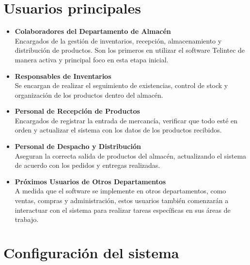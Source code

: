 \section{Usuarios principales}
\begin{itemize}
  \item \textbf{Colaboradores del Departamento de Almacén}\\
  Encargados de la gestión de inventarios, recepción, almacenamiento y distribución de productos. Son los primeros en utilizar el software Telintec de manera activa y principal foco en esta etapa inicial.

  \item \textbf{Responsables de Inventarios}\\
  Se encargan de realizar el seguimiento de existencias, control de stock y organización de los productos dentro del almacén.

  \item \textbf{Personal de Recepción de Productos}\\
  Encargados de registrar la entrada de mercancía, verificar que todo esté en orden y actualizar el sistema con los datos de los productos recibidos.

  \item \textbf{Personal de Despacho y Distribución}\\
  Aseguran la correcta salida de productos del almacén, actualizando el sistema de acuerdo con los pedidos y entregas realizadas.

  \item \textbf{Próximos Usuarios de Otros Departamentos}\\
  A medida que el software se implemente en otros departamentos, como ventas, compras y administración, estos usuarios también comenzarán a interactuar con el sistema para realizar tareas específicas en sus áreas de trabajo.
\end{itemize}



\section{Configuración del sistema}

